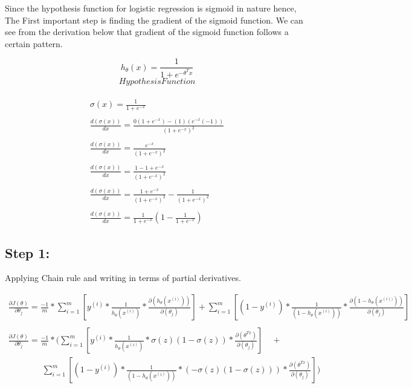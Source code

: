 \documentclass[10pt,a4paper]{article}
\begin{document}
Since the hypothesis function for logistic regression is sigmoid in nature hence, The First important step is finding the gradient of the sigmoid function. We can see from the derivation below that gradient of the sigmoid function follows a certain pattern.


$$h_\theta(x)=\frac{1}{1+e^{-\theta^Tx}}$$
$$Hypothesis Function$$
\\
\begin{equation*}
\begin{array}{l}
	 \sigma(x) = \frac{1}{1+e^{-x}}\\
	 \\
 	\frac{d(\sigma(x))}{dx} = \frac{0(1+e^{-x}) - (1)(e^{-x}(-1))}{(1+e^{-x})^2}\\
 	\\
 	\frac{d(\sigma(x))}{dx} = \frac{e^{-x}}{(1+e^{-x})^2}\\
 	\\
 	\frac{d(\sigma(x))}{dx} = \frac{1-1+e^{-x}}{(1+e^{-x})^2}\\
 	\\
 	\frac{d(\sigma(x))}{dx} = \frac{1+e^{-x}}{(1+e^{-x})^2} - \frac{1}{(1+e^{-x})^2}\\
 	\\
 	\frac{d(\sigma(x))}{dx} = \frac{1}{1+e^{-x}}(1 - \frac{1}{1+e^{-x}})
\end{array}
\end{equation*}


\subsection*{Step 1:}
Applying Chain rule and writing in terms of partial derivatives.

\begin{equation*}
\begin{array}{l}
	\frac{\partial J(\theta)}{\partial \theta_j}  = 
	\frac{-1}{m}*\sum_{i=1}^m [y^{(i)}*\frac{1}{h_\theta(x^{(i)})}										*\frac{\partial(h_\theta(x^{(i)}))}{\partial(\theta_j)}] + 
	\sum_{i=1}^m [ (1-y^{(i)})*\frac{1}{(1-h_\theta(x^{(i)}))}*\frac{\partial(1-						h_\theta(x^{(i))}))}{\partial(\theta_j)}]\\
	\\
	\frac{\partial J(\theta)}{\partial \theta_j} = \frac{-1}{m}*(\sum_{i=1}^m [y^{(i)}*\frac{1}			{h_\theta(x^{(i)})}*\sigma(z)(1-\sigma(z))*\frac{\partial(\theta^{Tx})}{\partial(\theta_j)}] 	\quad + \\
	
	\qquad \qquad \sum_{i=1}^m [ (1-y^{(i)})*\frac{1}{(1-h_\theta(x^{(i)}))}*
	(-\sigma(z)(1-\sigma(z)))*\frac{\partial(\theta^{Tx})}{\partial(\theta_j)}])
\end{array}
\end{equation*}
\end{document}
